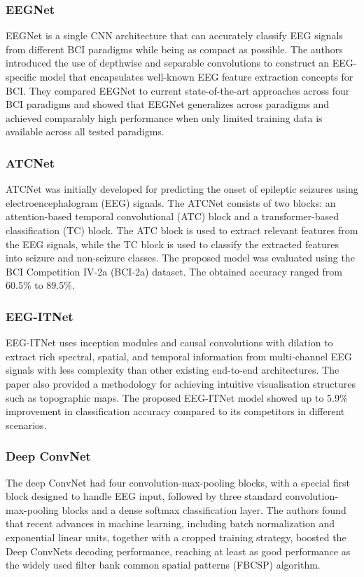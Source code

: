 \documentclass[runningheads]{llncs}
\begin{document}
\subsubsection{EEGNet}
EEGNet is a single CNN architecture that can accurately classify EEG signals from different BCI paradigms while being as compact as possible. The authors introduced the use of depthwise and separable convolutions to construct an EEG-specific model that encapsulates well-known EEG feature extraction concepts for BCI. They compared EEGNet to current state-of-the-art approaches across four BCI paradigms and showed that EEGNet generalizes across paradigms and achieved comparably high performance when only limited training data is available across all tested paradigms.

\subsubsection{ATCNet}
ATCNet was initially developed for predicting the onset of epileptic seizures using electroencephalogram (EEG) signals. The ATCNet consists of two blocks: an attention-based temporal convolutional (ATC) block and a transformer-based classification (TC) block. The ATC block is used to extract relevant features from the EEG signals, while the TC block is used to classify the extracted features into seizure and non-seizure classes. The proposed model was evaluated using the BCI Competition IV-2a (BCI-2a) dataset. The obtained accuracy ranged from 60.5\% to 89.5\%.


\subsubsection{EEG-ITNet}
EEG-ITNet uses inception modules and causal convolutions with dilation to extract rich spectral, spatial, and temporal information from multi-channel EEG signals with less complexity than other existing end-to-end architectures. The paper also provided a methodology for achieving intuitive visualisation structures such as topographic maps. The proposed EEG-ITNet model showed up to 5.9\% improvement in classification accuracy compared to its competitors in different scenarios.

\subsubsection{Deep ConvNet}
The deep ConvNet had four convolution-max-pooling blocks, with a special first block designed to handle EEG input, followed by three standard convolution-max-pooling blocks and a dense softmax classification layer. The authors found that recent advances in machine learning, including batch normalization and exponential linear units, together with a cropped training strategy, boosted the Deep ConvNets decoding performance, reaching at least as good performance as the widely used filter bank common spatial patterns (FBCSP) algorithm.
\end{document}
